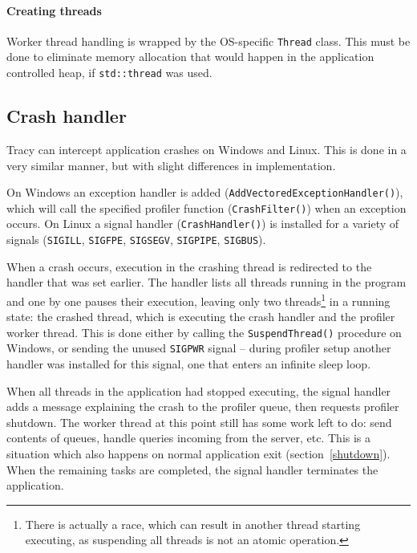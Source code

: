 \documentclass[hidelinks,titlepage,a4paper]{article}
\begin{document}
\paragraph{Creating threads}

Worker thread handling is wrapped by the OS-specific \texttt{Thread} class. This must be done to eliminate memory allocation that would happen in the application controlled heap, if \texttt{std::thread} was used.

\subsection{Crash handler}
\label{crashhandler}

Tracy can intercept application crashes on Windows and Linux. This is done in a very similar manner, but with slight differences in implementation.

On Windows an exception handler is added (\texttt{AddVectoredExceptionHandler()}), which will call the specified profiler function (\texttt{CrashFilter()}) when an exception occurs. On Linux a signal handler (\texttt{CrashHandler()}) is installed for a variety of signals (\texttt{SIGILL}, \texttt{SIGFPE}, \texttt{SIGSEGV}, \texttt{SIGPIPE}, \texttt{SIGBUS}).

When a crash occurs, execution in the crashing thread is redirected to the handler that was set earlier. The handler lists all threads running in the program and one by one pauses their execution, leaving only two threads\footnote{There is actually a race, which can result in another thread starting executing, as suspending all threads is not an atomic operation.} in a running state: the crashed thread, which is executing the crash handler and the profiler worker thread. This is done either by calling the \texttt{SuspendThread()} procedure on Windows, or sending the unused \texttt{SIGPWR} signal -- during profiler setup another handler was installed for this signal, one that enters an infinite sleep loop.

When all threads in the application had stopped executing, the signal handler adds a message explaining the crash to the profiler queue, then requests profiler shutdown. The worker thread at this point still has some work left to do: send contents of queues, handle queries incoming from the server, etc. This is a situation which also happens on normal application exit (section~\ref{shutdown}). When the remaining tasks are completed, the signal handler terminates the application.
\end{document}
